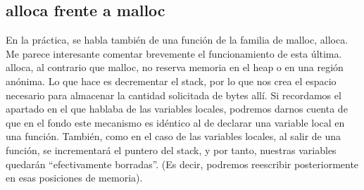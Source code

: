 \documentclass[a4paper]{article}
\begin{document}
\subsection{{\ttfamily alloca} frente a {\ttfamily malloc}}

En la práctica, se habla también de una función de la familia de {\ttfamily malloc}, {\ttfamily alloca}. Me parece interesante comentar brevemente el funcionamiento de esta última. {\ttfamily alloca}, al contrario que {\ttfamily malloc}, no reserva memoria en el heap o en una región anónima. Lo que hace es decrementar el stack, por lo que nos crea el espacio necesario para almacenar la cantidad solicitada de bytes allí. Si recordamos el apartado en el que hablaba de las variables locales, podremos darnos cuenta de que en el fondo este mecanismo es idéntico al de declarar una variable local en una función. También, como en el caso de las variables locales, al salir de una función, se incrementará el puntero del stack, y por tanto, nuestras variables quedarán ``efectivamente borradas''. (Es decir, podremos reescribir posteriormente en esas posiciones de memoria).
\end{document}
